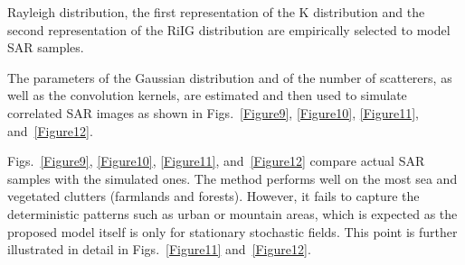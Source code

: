 \documentclass[journal]{IEEEtran}
\begin{document}
\begin{figure*}[hbt]
\centering
\caption{Texture patches from SAR images}\label{Figure8-SelectedPatches}
\end{figure*}

Rayleigh distribution, the first representation of the K distribution and the second representation of the RiIG distribution are empirically selected to model SAR samples.

The parameters of the Gaussian distribution and of the number of scatterers, as well as the convolution kernels, are estimated and then used to simulate correlated SAR images as shown in Figs.~\ref{Figure9}, \ref{Figure10}, \ref{Figure11}, and~\ref{Figure12}.

Figs.~\ref{Figure9}, \ref{Figure10}, \ref{Figure11}, and~\ref{Figure12} compare actual SAR samples with the simulated ones.
The method performs well on the most sea and vegetated clutters (farmlands and forests).
However, it fails to capture the deterministic patterns such as urban or mountain areas, which is expected as the proposed model itself is only for stationary stochastic fields.
This point is further illustrated in detail in Figs.~\ref{Figure11} and~\ref{Figure12}.

\begin{figure*}[hbt]
\centering
\begin{subfigure}[t]{4 cm}
	\centering
\end{subfigure}
\quad
\begin{subfigure}[t]{4 cm}
	\centering
\end{subfigure}
\quad
\begin{subfigure}[t]{4 cm}
	\centering
\end{subfigure}
\quad
\begin{subfigure}[t]{4 cm}
	\centering
\end{subfigure}
\quad
\begin{subfigure}[t]{4 cm}
	\centering
\end{subfigure}
\quad
\begin{subfigure}[t]{4 cm}
	\centering
\end{subfigure}
\quad
\begin{subfigure}[t]{4 cm}
	\centering
\end{subfigure}
\quad
\begin{subfigure}[t]{4 cm}
	\centering
\end{subfigure}
\caption{Comparison of real (top row) and simulated (bottom row) SAR textures of various scenarios acquired by different systems, from left to right: Sea1, Sea2, Sea3 and Sea4 as labeled in Fig.~\ref{Figure8-SelectedPatches}}\label{Figure9}
\end{figure*}
\end{document}
